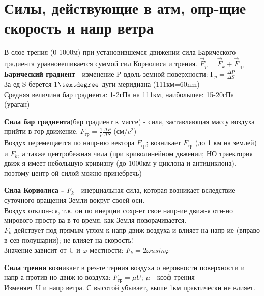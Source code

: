 
\section{Силы, действующие в атм, опр-щие скорость и напр ветра}
В слое трения (0-1000м) при установившемся движении сила Барического градиента уравновешивается суммой сил Кориолиса и трения. $\vec{F}_{p}=\vec{F}_{k}+\vec{F}_{\text{тр}}$\\
\textbf{Барический градиент} - изменение P вдоль земной поверхности: $\text{Г}_{p}=\frac{\varDelta P}{\varDelta S}$\\
За ед S берется 1$\textdegree$ дуги меридиана (111км=60nm)\\
Средняя величина бар градиента: 1-2гПа на 111км, наибольшее: 15-20гПа (ураган)\\
\par \textbf{Сила бар градиента}(бар градиент к массе) - сила, заставляющая массу воздуха прийти в гор движение. $F_{\text{гр}}=\frac{1}{\rho}\frac{\varDelta P}{\varDelta S}$ (см/$c^2$)\\
Воздух перемещается по напр-ию вектора $F_{\text{гр}}$; возникает $F_{\text{тр}}$ (до 1 км на землей) и $F_k$, а также центробежная чила (при криволинейном двжении; НО траектория движ-я имеет небольшую кривизну (до 1000км у циклона и антициклона), поэтому центр-ой силой можно принебречь)
\par \textbf{Сила Кориолиса - $F_k$} - инерциальная сила, которая возникает вследствие суточного вращения Земли вокруг своей оси.\\
Воздух отклон-ся, т.к. он по инерции сохр-ет свое напр-ие движ-я отн-но мирового простр-ва в то время, как Земля поворачивается.\\
$F_k$ действует под прямым углом к напр движ воздуха и влияет на напр-ие (вправо в сев полушарии); не влияет на скорость!\\
Значение зависит от U и $\varphi$ местности: $F_{k}=2\omega usin\varphi$
\par \textbf{Сила трения} возникает в рез-те терния воздуха о неровности поверхности и напр-а против-но движ-ю воздуха: $F_\text{тр}=\mu U$; $\mu$ - коэф трения\\
Изменяет U и напр ветра. С высотой убывает, выше 1км практически не влияет.
